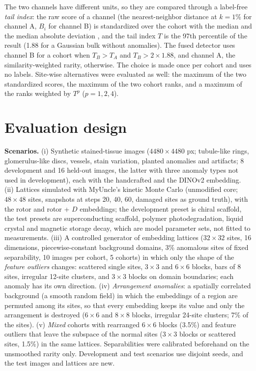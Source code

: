 \documentclass[final,5p,times,twocolumn,authoryear]{elsarticle}
\begin{document}
The two channels have different units, so they are compared through a label-free \emph{tail index}: the raw score of a channel (the nearest-neighbor distance at $k=1\%$ for channel A, $B_i$ for channel B) is standardized over the cohort with the median and the median absolute deviation \citep{Rousseeuw1993}, and the tail index $T$ is the 97th percentile of the result (1.88 for a Gaussian bulk without anomalies). The fused detector uses channel B for a cohort when $T_B>T_A$ and $T_B>2\times1.88$, and channel A, the similarity-weighted rarity, otherwise. The choice is made once per cohort and uses no labels. Site-wise alternatives were evaluated as well: the maximum of the two standardized scores, the maximum of the two cohort ranks, and a maximum of the ranks weighted by $T^p$ ($p=1,2,4$).

\section{Evaluation design}
\textbf{Scenarios.} (i) Synthetic stained-tissue images ($4480\times4480$ px; tubule-like rings, glomerulus-like discs, vessels, stain variation, planted anomalies and artifacts; 8 development and 16 held-out images, the latter with three anomaly types not used in development), each with the handcrafted and the DINOv2 embedding. (ii) Lattices simulated with MyUncle's kinetic Monte Carlo (unmodified core; $48\times48$ sites, snapshots at steps 20, 40, 60, damaged sites as ground truth), with the rotor and rotor + $D$ embeddings; the development preset is chiral scaffold, the test presets are superconducting scaffold, polymer photodegradation, liquid crystal and magnetic storage decay, which are model parameter sets, not fitted to measurements. (iii) A controlled generator of embedding lattices ($32\times32$ sites, 16 dimensions, piecewise-constant background domains, 3\% anomalous sites of fixed separability, 10 images per cohort, 5 cohorts) in which only the shape of the \emph{feature outliers} changes: scattered single sites, $3\times3$ and $6\times6$ blocks, bars of 8 sites, irregular 12-site clusters, and $3\times3$ blocks on domain boundaries; each anomaly has its own direction. (iv) \emph{Arrangement anomalies}: a spatially correlated background (a smooth random field) in which the embeddings of a region are permuted among its sites, so that every embedding keeps its value and only the arrangement is destroyed ($6\times6$ and $8\times8$ blocks, irregular 24-site clusters; 7\% of the sites). (v) \emph{Mixed} cohorts with rearranged $6\times6$ blocks (3.5\%) and feature outliers that leave the subspace of the normal sites ($3\times3$ blocks or scattered sites, 1.5\%) in the same lattices. Separabilities were calibrated beforehand on the unsmoothed rarity only. Development and test scenarios use disjoint seeds, and the test images and lattices are new.
\end{document}
